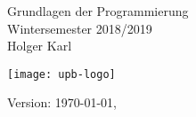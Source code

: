 \documentclass[a4paper,11pt]{memoir}
\begin{document}



\thispagestyle{empty}
\begin{titlingpage}
  \centering 
  \vspace*{5cm}
  {\huge Grundlagen der Programmierung}
  \\[2ex]
  {\large Wintersemester 2018/2019}
  \\[2ex]
  {\large Holger Karl}
  \vfill
  \begin{center}
    \texttt{[image: upb-logo]}
  \end{center}
  \vspace{1cm}
  Version: \today, \currenttime
\end{titlingpage}
\pagestyle{companion}


\cleardoublepage
\tableofcontents

\listoffigures
\renewcommand{\listtheoremname}{Liste von Definitionen u.ä.}
\listoftheorems 
\newpage
{}
%
% 
% 


\end{document}
